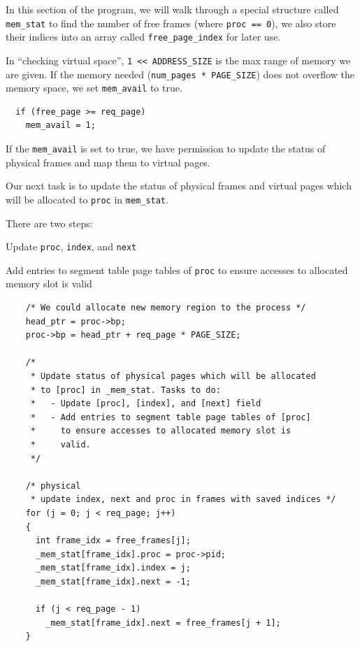 \documentclass[a4paper]{article}
\numberwithin{equation}{section}
\begin{document}
In this section of the program, we will walk through a special structure called \texttt{mem_stat} to find the number of free frames (where \texttt{proc == 0}), we also store their indices into an array called \texttt{free_page_index} for later use.

In ``checking virtual space'', \texttt{1 << ADDRESS_SIZE} is the max range of memory we are given.
If the memory needed (\texttt{num_pages * PAGE_SIZE}) does not overflow the memory space, we set \texttt{mem_avail} to true.
\begin{mdframed}[leftline=false,rightline=false,backgroundcolor=magenta!10,nobreak=false]
  \begin{verbatim}
  if (free_page >= req_page)
    mem_avail = 1;
    \end{verbatim}
\end{mdframed}

If the \texttt{mem_avail} is set to true, we have permission to update the status of physical frames and map them to virtual pages.

Our next task is to update the status of physical frames and virtual pages which will be allocated to \texttt{proc} in \texttt{mem_stat}.

There are two steps:
\begin{steps}
  \item Update \texttt{proc}, \texttt{index}, and \texttt{next}
  \item Add entries to segment table page tables of \texttt{proc} to ensure accesses to allocated memory slot is valid
\end{steps}
\begin{mdframed}[leftline=false,rightline=false,backgroundcolor=magenta!10,nobreak=false]
  \begin{verbatim}
    /* We could allocate new memory region to the process */
    head_ptr = proc->bp;
    proc->bp = head_ptr + req_page * PAGE_SIZE;

    /*
     * Update status of physical pages which will be allocated
     * to [proc] in _mem_stat. Tasks to do:
     *   - Update [proc], [index], and [next] field
     *   - Add entries to segment table page tables of [proc]
     *     to ensure accesses to allocated memory slot is
     *     valid.
     */

    /* physical
     * update index, next and proc in frames with saved indices */
    for (j = 0; j < req_page; j++)
    {
      int frame_idx = free_frames[j];
      _mem_stat[frame_idx].proc = proc->pid;
      _mem_stat[frame_idx].index = j;
      _mem_stat[frame_idx].next = -1;

      if (j < req_page - 1)
        _mem_stat[frame_idx].next = free_frames[j + 1];
    }
  \end{verbatim}
\end{mdframed}
\end{document}
